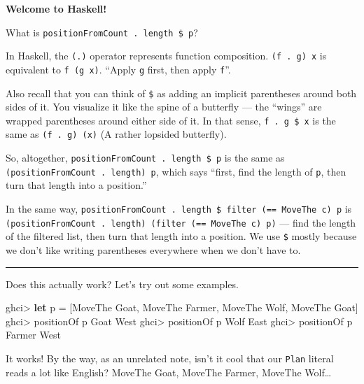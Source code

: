 \documentclass[]{article}
\newenvironment{Shaded}{}{}
\newcommand{\KeywordTok}[1]{\textcolor[rgb]{0.00,0.44,0.13}{\textbf{{#1}}}}
\newcommand{\DataTypeTok}[1]{\textcolor[rgb]{0.56,0.13,0.00}{{#1}}}
\newcommand{\FunctionTok}[1]{\textcolor[rgb]{0.02,0.16,0.49}{{#1}}}
\newcommand{\NormalTok}[1]{{#1}}
\begin{document}
\textbf{Welcome to Haskell!}

What is \texttt{positionFromCount\ .\ length\ \$\ p}?

In Haskell, the \texttt{(.)} operator represents function composition.
\texttt{(f\ .\ g)\ x} is equivalent to \texttt{f\ (g\ x)}. ``Apply \texttt{g}
first, then apply \texttt{f}''.

Also recall that you can think of \texttt{\$} as adding an implicit parentheses
around both sides of it. You visualize it like the spine of a butterfly --- the
``wings'' are wrapped parentheses around either side of it. In that sense,
\texttt{f\ .\ g\ \$\ x} is the same as \texttt{(f\ .\ g)\ (x)} (A rather
lopsided butterfly).

So, altogether, \texttt{positionFromCount\ .\ length\ \$\ p} is the same as
\texttt{(positionFromCount\ .\ length)\ p}, which says ``first, find the length
of \texttt{p}, then turn that length into a position.''

In the same way,
\texttt{positionFromCount\ .\ length\ \$\ filter\ (==\ MoveThe\ c)\ p} is
\texttt{(positionFromCount\ .\ length)\ (filter\ (==\ MoveThe\ c)\ p)} --- find
the length of the filtered list, then turn that length into a position. We use
\texttt{\$} mostly because we don't like writing parentheses everywhere when we
don't have to.

\begin{center}\rule{0.5\linewidth}{\linethickness}\end{center}

Does this actually work? Let's try out some examples.

\begin{Shaded}
\begin{Highlighting}[]
\NormalTok{ghci}\FunctionTok{>} \KeywordTok{let} \NormalTok{p }\FunctionTok{=} \NormalTok{[}\DataTypeTok{MoveThe} \DataTypeTok{Goat}\NormalTok{, }\DataTypeTok{MoveThe} \DataTypeTok{Farmer}\NormalTok{, }\DataTypeTok{MoveThe} \DataTypeTok{Wolf}\NormalTok{, }\DataTypeTok{MoveThe} \DataTypeTok{Goat}\NormalTok{]}
\NormalTok{ghci}\FunctionTok{>} \NormalTok{positionOf p }\DataTypeTok{Goat}
\DataTypeTok{West}
\NormalTok{ghci}\FunctionTok{>} \NormalTok{positionOf p }\DataTypeTok{Wolf}
\DataTypeTok{East}
\NormalTok{ghci}\FunctionTok{>} \NormalTok{positionOf p }\DataTypeTok{Farmer}
\DataTypeTok{West}
\end{Highlighting}
\end{Shaded}

It works! By the way, as an unrelated note, isn't it cool that our \texttt{Plan}
literal reads a lot like English? MoveThe Goat, MoveThe Farmer, MoveThe
Wolf\ldots{}
\end{document}
